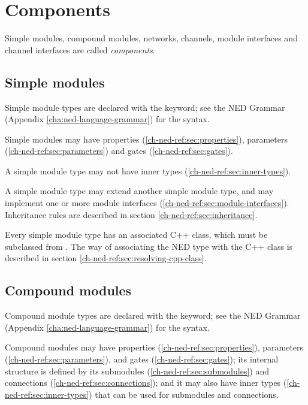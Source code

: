 \section{Components}

Simple modules, compound modules, networks, channels, module interfaces
and channel interfaces are called \textit{components}.


\subsection{Simple modules}

Simple module types are declared with the  keyword;
see the NED Grammar (Appendix \ref{cha:ned-language-grammar}) for the
syntax.

Simple modules may have properties (\ref{ch-ned-ref:sec:properties}),
parameters (\ref{ch-ned-ref:sec:parameters})
and gates (\ref{ch-ned-ref:sec:gates}).

A simple module type may not have inner types (\ref{ch-ned-ref:sec:inner-types}).

A simple module type may extend another simple module type, and
may implement one or more module interfaces (\ref{ch-ned-ref:sec:module-interfaces}).
Inheritance rules are described in section \ref{ch-ned-ref:sec:inheritance}.

Every simple module type has an associated C++ class, which must be
subclassed from . The way of associating the
NED type with the C++ class is described in section
\ref{ch-ned-ref:sec:resolving-cpp-class}.



\subsection{Compound modules}
\label{ch-ned-ref:sec:compound-modules}

Compound module types are declared with the  keyword;
see the NED Grammar (Appendix \ref{cha:ned-language-grammar}) for the
syntax.

Compound modules may have properties (\ref{ch-ned-ref:sec:properties}),
parameters (\ref{ch-ned-ref:sec:parameters}),
and gates (\ref{ch-ned-ref:sec:gates}); its internal structure is defined by
its submodules (\ref{ch-ned-ref:sec:submodules}) and
connections (\ref{ch-ned-ref:sec:connections});
and it may also have inner types (\ref{ch-ned-ref:sec:inner-types})
that can be used for submodules and connections.

